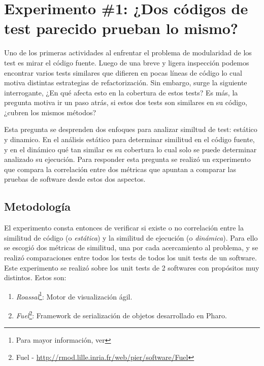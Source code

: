 \chapter{Experimento \#1: ¿Dos códigos de test parecido prueban lo mismo? }

\par Uno de los primeras actividades al enfrentar el problema de modularidad de los test es mirar el código fuente. Luego de una breve y ligera inspección podemos encontrar varios tests similares que difieren en pocas líneas de código lo cual motiva distintas estrategias de refactorización. Sin embargo, surge la siguiente interrogante, ¿En qué afecta esto en la cobertura de estos tests? Es más, la pregunta motiva ir un paso atrás, si estos dos tests son similares en su código, ¿cubren los mismos métodos?

\par Esta pregunta se desprenden dos enfoques para analizar similtud de test: estático y dinamico. En el análisis estático para determinar similitud en el código fuente, y en el dinámico qué tan similar es su cobertura lo cual solo se puede determinar analizado su ejecución. Para responder esta pregunta se realizó un experimento que compara la correlación entre dos métricas que apuntan a comparar las pruebas de software desde estos dos aspectos.

\section{Metodología}

\par El experimento consta entonces de verificar si existe o no correlación  entre la similitud de código (o \emph{estática}) y la similitud de ejecución (o \emph{dinámica}). Para ello se escogió dos métricas de similitud, una por cada acercamiento al problema, y se realizó comparaciones entre todos los tests de todos los unit tests de un software. Este experimento se realizó sobre los unit tests de 2 softwares con propósitos muy distintos. Estos son: 

\begin{enumerate} 
\item \emph{Roassal}\footnote{Para mayor información, ver }: Motor de visualización ágil.
\item \emph{Fuel}\footnote{Fuel - \url{http://rmod.lille.inria.fr/web/pier/software/Fuel}}: Framework de serialización de objetos desarrollado en Pharo.
\end{enumerate}

